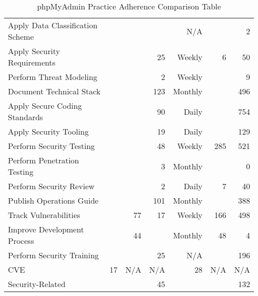 \begin{table*}
	\begin{center}	
		\caption{phpMyAdmin Practice Adherence Comparison Table}
		\begin{tiny}
			
			\begin{tabular}{|l|rrr||rrr|}
				Apply Data Classification Scheme & &  &  & N/A & & 2\\
				Apply Security Requirements  & &  & 25  & Weekly & 6 & 50\\
				Perform Threat Modeling &  &  & 2  & Weekly & & 9\\
				Document Technical Stack  &  &  & 123  & Monthly & & 496\\
				Apply Secure Coding Standards  &  &  & 90  & Daily & & 754\\
				Apply Security Tooling  &  &  & 19 & Daily & & 129\\
				Perform Security Testing &  &  & 48  & Weekly & 285 & 521\\
				Perform Penetration Testing  &  &  & 3  & Monthly & & 0\\
				Perform Security Review  &  &  & 2  & Daily & 7 & 40\\
				Publish Operations Guide &  &  & 101 & Monthly & & 388\\
				Track Vulnerabilities & & 77 & 17  & Weekly & 166 & 498\\
				Improve Development Process & & 44 &  & Monthly & 48 & 4\\
				Perform Security Training &  &  & 25 & N/A & & 196\\
				CVE & 17 & N/A & N/A & 28 & N/A & N/A\\
				Security-Related &  &  & 45 & & & 132 \\
				
			\end{tabular}
			
			\label{tab:openssl_paComparisonTable}
		\end{tiny}
	\end{center}
\end{table*}


